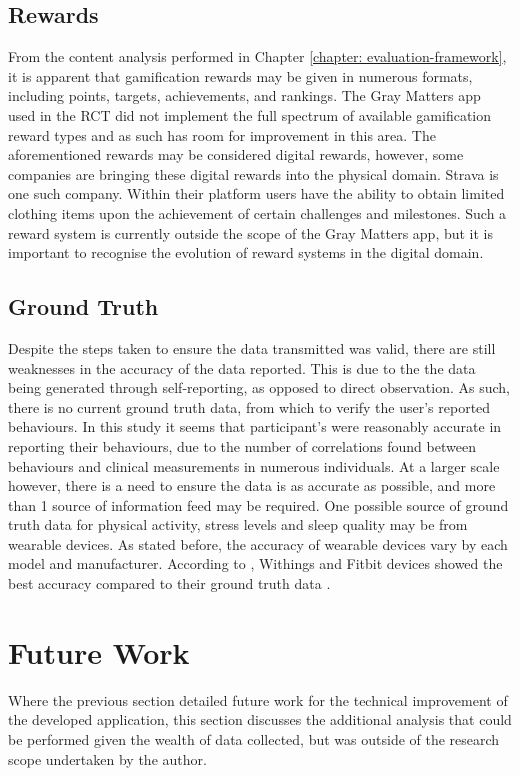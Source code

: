 \subsection{Rewards}
From the content analysis performed in Chapter \ref{chapter: evaluation-framework}, it is apparent that gamification rewards may be given in numerous formats, including points, targets, achievements, and rankings. The Gray Matters app used in the RCT did not implement the full spectrum of available gamification reward types and as such has room for improvement in this area. The aforementioned rewards may be considered digital rewards, however, some companies are bringing these digital rewards into the physical domain. Strava is one such company. Within their platform users have the ability to obtain limited clothing items upon the achievement of certain challenges and milestones. Such a reward system is currently outside the scope of the Gray Matters app, but it is important to recognise the evolution of reward systems in the digital domain.

\subsection{Ground Truth}
Despite the steps taken to ensure the data transmitted was valid, there are still weaknesses in the accuracy of the data reported. This is due to the the data being generated through self-reporting, as opposed to direct observation. As such, there is no current ground truth data, from which to verify the user's reported behaviours. In this study it seems that participant's were reasonably accurate in reporting their behaviours, due to the number of correlations found between behaviours and clinical measurements in numerous individuals. At a larger scale however, there is a need to ensure the data is as accurate as possible, and more than 1 source of information feed may be required.
One possible source of ground truth data for physical activity, stress levels and sleep quality may be from wearable devices. As stated before, the accuracy of wearable devices vary by each model and manufacturer. According to \citeauthor{Ferguson2015}, Withings and Fitbit devices showed the best accuracy compared to their ground truth data \cite{Ferguson2015}.

\section{Future Work}
Where the previous section detailed future work for the technical improvement of the developed application, this section discusses the additional analysis that could be performed given the wealth of data collected, but was outside of the research scope undertaken by the author.

